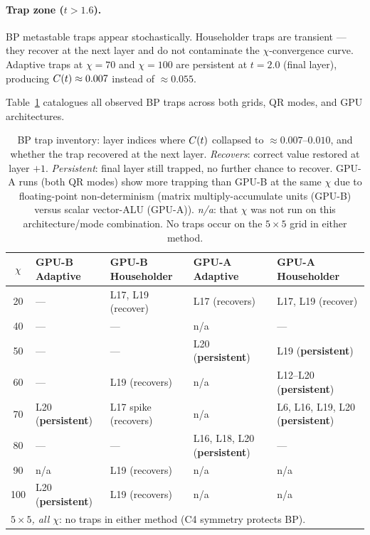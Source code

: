 \paragraph{Trap zone ($t > 1.6$).}
BP metastable traps appear stochastically.
Householder traps are transient --- they recover at the next layer and do not
contaminate the $\chi$-convergence curve.
Adaptive traps at $\chi=70$ and $\chi=100$ are persistent at $t=2.0$
(final layer), producing $C(t) \approx 0.007$ instead of $\approx 0.055$.

Table~\ref{tab:trap_inventory} catalogues all observed BP traps across both
grids, QR modes, and GPU architectures.

\begin{table}[ht]
\centering
\caption{BP trap inventory: layer indices where $C(t)$ collapsed to
 $\approx 0.007$--$0.010$, and whether the trap recovered at the next layer.
 \emph{Recovers}: correct value restored at layer $+1$.
 \emph{Persistent}: final layer still trapped, no further chance to recover.
 GPU-A runs (both QR modes) show more trapping than GPU-B at the same $\chi$ due to
 floating-point non-determinism (matrix multiply-accumulate units (GPU-B) versus scalar vector-ALU (GPU-A)).
 \emph{n/a}: that $\chi$ was not run on this architecture/mode combination.
 No traps occur on the $5\times5$ grid in either method.}
\label{tab:trap_inventory}
\small
\begin{tabular}{cllll}
\toprule
$\chi$ & GPU-B Adaptive & GPU-B Householder & GPU-A Adaptive & GPU-A Householder \\
\midrule
20 & --- & L17, L19 (recover) & L17 (recovers) & L17, L19 (recover) \\
40 & --- & --- & n/a & --- \\
50 & --- & --- & L20 (\textbf{persistent}) & L19 (\textbf{persistent}) \\
60 & --- & L19 (recovers) & n/a & L12--L20 (\textbf{persistent}) \\
70 & L20 (\textbf{persistent}) & L17 spike (recovers) & n/a & L6, L16, L19, L20 (\textbf{persistent}) \\
80 & --- & --- & L16, L18, L20 (\textbf{persistent}) & --- \\
90 & n/a & L19 (recovers) & n/a & n/a \\
100 & L20 (\textbf{persistent}) & L19 (recovers) & n/a & n/a \\
\midrule
\multicolumn{5}{l}{\emph{$5\times5$, all $\chi$}: no traps in either method (C4 symmetry protects BP).} \\
\bottomrule
\end{tabular}
\end{table}

